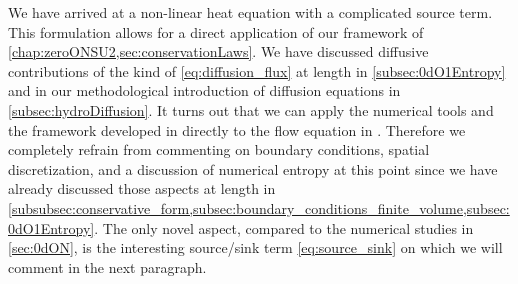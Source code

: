 We have arrived at a non-linear heat equation with a complicated source term. 
This formulation allows for a direct application of our \cfd{} framework of \cref{chap:zeroONSU2,sec:conservationLaws}.
We have discussed diffusive contributions of the kind of \cref{eq:diffusion_flux} at length in \cref{subsec:0dO1Entropy} and in our methodological introduction of diffusion equations in \cref{subsec:hydroDiffusion}.
It turns out that we can apply the numerical tools and the \cfd{} framework developed in \dzero{} directly to the \lpa{} flow equation in \dtwo{}.
Therefore we completely refrain from commenting on boundary conditions, spatial discretization, and a discussion of numerical entropy at this point since we have already discussed those aspects at length in \cref{subsubsec:conservative_form,subsec:boundary_conditions_finite_volume,subsec:0dO1Entropy}.
The only novel aspect, compared to the numerical studies in \cref{sec:0dON}, is the interesting source/sink term \eqref{eq:source_sink} on which we will comment in the next paragraph.

